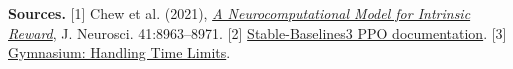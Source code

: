 \documentclass[10pt,letterpaper]{article}
\begin{document}
\vspace{2pt}
{\footnotesize\textbf{Sources.} [1] Chew et al. (2021), \href{https://www.jneurosci.org/content/41/43/8963}{\emph{A Neurocomputational Model for Intrinsic Reward}}, J. Neurosci. 41:8963--8971. [2] \href{https://stable-baselines3.readthedocs.io/en/master/modules/ppo.html}{Stable-Baselines3 PPO documentation}. [3] \href{https://gymnasium.farama.org/tutorials/gymnasium_basics/handling_time_limits/}{Gymnasium: Handling Time Limits}.}
\end{document}

